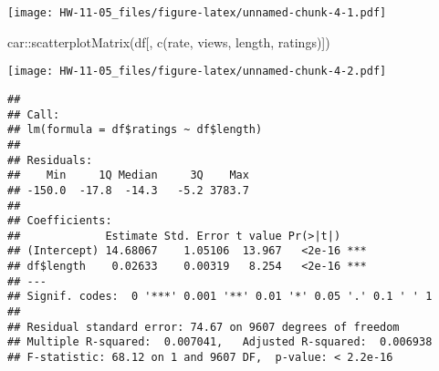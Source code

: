 \documentclass[
]{article}
\newenvironment{Shaded}{\begin{snugshade}}{\end{snugshade}}
\newcommand{\AttributeTok}[1]{\textcolor[rgb]{0.77,0.63,0.00}{#1}}
\newcommand{\DecValTok}[1]{\textcolor[rgb]{0.00,0.00,0.81}{#1}}
\newcommand{\FunctionTok}[1]{\textcolor[rgb]{0.00,0.00,0.00}{#1}}
\newcommand{\NormalTok}[1]{#1}
\newcommand{\OtherTok}[1]{\textcolor[rgb]{0.56,0.35,0.01}{#1}}
\newcommand{\SpecialCharTok}[1]{\textcolor[rgb]{0.00,0.00,0.00}{#1}}
\newcommand{\StringTok}[1]{\textcolor[rgb]{0.31,0.60,0.02}{#1}}
\begin{document}
\begin{Shaded}
\end{Shaded}

\texttt{[image: HW-11-05\_files/figure-latex/unnamed-chunk-4-1.pdf]}

\begin{Shaded}
\begin{Highlighting}[]
\NormalTok{car}\SpecialCharTok{::}\FunctionTok{scatterplotMatrix}\NormalTok{(df[, }\FunctionTok{c}\NormalTok{(}\StringTok{\textquotesingle{}rate\textquotesingle{}}\NormalTok{, }\StringTok{\textquotesingle{}views\textquotesingle{}}\NormalTok{, }\StringTok{\textquotesingle{}length\textquotesingle{}}\NormalTok{, }\StringTok{\textquotesingle{}ratings\textquotesingle{}}\NormalTok{)])}
\end{Highlighting}
\end{Shaded}

\texttt{[image: HW-11-05\_files/figure-latex/unnamed-chunk-4-2.pdf]}

\begin{Shaded}
\end{Shaded}

\begin{verbatim}
## 
## Call:
## lm(formula = df$ratings ~ df$length)
## 
## Residuals:
##    Min     1Q Median     3Q    Max 
## -150.0  -17.8  -14.3   -5.2 3783.7 
## 
## Coefficients:
##             Estimate Std. Error t value Pr(>|t|)    
## (Intercept) 14.68067    1.05106  13.967   <2e-16 ***
## df$length    0.02633    0.00319   8.254   <2e-16 ***
## ---
## Signif. codes:  0 '***' 0.001 '**' 0.01 '*' 0.05 '.' 0.1 ' ' 1
## 
## Residual standard error: 74.67 on 9607 degrees of freedom
## Multiple R-squared:  0.007041,   Adjusted R-squared:  0.006938 
## F-statistic: 68.12 on 1 and 9607 DF,  p-value: < 2.2e-16
\end{verbatim}
\end{document}

